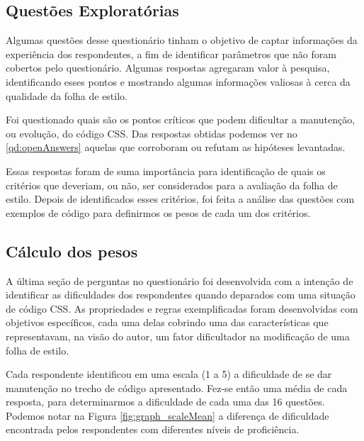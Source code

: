 \subsection{Questões Exploratórias}

Algumas questões desse questionário tinham o objetivo de captar informações da experiência dos respondentes, a fim de identificar parâmetros que não foram cobertos pelo questionário. Algumas respostas agregaram valor à pesquisa, identificando esses pontos e mostrando algumas informações valiosas à cerca da qualidade da folha de estilo. 

Foi questionado quais são os pontos críticos que podem dificultar a manutenção, ou evolução, do código CSS. Das respostas obtidas podemos ver no \autoref{qd:openAnswers} aquelas que corroboram ou refutam as hipóteses levantadas.



Essas respostas foram de suma importância para identificação de quais os critérios que deveriam, ou não, ser considerados para a avaliação da folha de estilo. Depois de identificados esses critérios, foi feita a análise das questões com exemplos de código para definirmos os pesos de cada um dos critérios.

\subsection{Cálculo dos pesos}

A última seção de perguntas no questionário foi desenvolvida com a intenção de identificar as dificuldades dos respondentes quando deparados com uma situação de código CSS. As propriedades e regras exemplificadas foram desenvolvidas com objetivos específicos, cada uma delas cobrindo uma das características que representavam, na visão do autor, um fator dificultador na modificação de uma folha de estilo.

Cada respondente identificou em uma escala (1 a 5) a dificuldade de se dar manutenção no trecho de código apresentado. Fez-se então uma média de cada resposta, para determinarmos a dificuldade de cada uma das 16 questões.
Podemos notar na Figura \autoref{fig:graph_scaleMean} a diferença de dificuldade encontrada pelos respondentes com diferentes níveis de proficiência.


